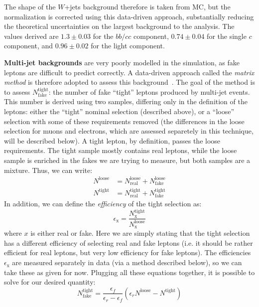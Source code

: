The shape of the $W$+jets background therefore is taken from MC, but the normalization is corrected using this data-driven approach, substantially reducing the theoretical uncertainties on the largest background to the analysis. The values derived are $1.3 \pm 0.03$ for the $bb/cc$ component, $0.74 \pm 0.04$ for the single $c$ component, and $0.96 \pm 0.02$ for the light component.

\textbf{Multi-jet backgrounds} are very poorly modelled in the simulation, as fake leptons are difficult to predict correctly. A data-driven approach called the \textit{matrix method} is therefore adopted to assess this background~\cite{MatrixMethod,ATLAS-CONF-2014-058}. The goal of the method is to assess $N_\mathrm{fake}^\mathrm{tight}$: the number of fake ``tight'' leptons produced by multi-jet events.  This number is derived using two samples, differing only in the definition of the leptons: either the ``tight'' nominal selection (described above), or a ``loose'' selection with some of these requirements removed (the differences in the loose selection for muons and electrons, which are assessed separetely in this technique, will be described below). A tight lepton, by definition, passes the loose requirements. The tight sample mostly contains real leptons, while the loose sample is enriched in the fakes we are trying to measure, but both samples are a mixture. Thus, we can write:
%
\begin{align}
N^\mathrm{loose} &= N_\mathrm{real}^\mathrm{loose} + N_\mathrm{fake}^\mathrm{loose}\\
N^\mathrm{tight} &= N_\mathrm{real}^\mathrm{tight} + N_\mathrm{fake}^\mathrm{tight}
\end{align}
%
In addition, we can define the \textit{efficiency} of the tight selection as:
%
\begin{equation}
\epsilon_\mathrm{x} = \frac{N^\mathrm{tight}_\mathrm{x}}{N^\mathrm{loose}_\mathrm{x}}
\end{equation}
%
where $x$ is either real or fake. Here we are simply stating that the tight selection has a different efficiency of selecting real and fake leptons (i.e. it should be rather efficient for real leptons, but very low efficiency for fake leptons). The efficiencies $\epsilon_\mathrm{x}$ are measured separately in data (via a method described below), so we can take these as given for now. Plugging all these equations together, it is possible to solve for our desired quantity:
%
\begin{equation}
N_\mathrm{fake}^\mathrm{tight} = \frac{\epsilon_f}{\epsilon_r - \epsilon_f} \left(\epsilon_r N^\mathrm{loose} - N^\mathrm{tight} \right)
\end{equation}

